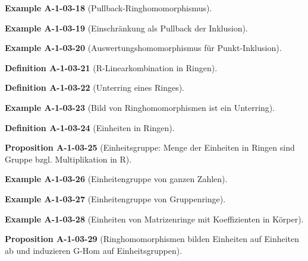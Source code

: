 \documentclass[10pt, letterpaper]{article}
\newcommand{\CustomHeading}[3]{%
  \par\medskip\noindent%
  \textbf{#1 #2} \textnormal{(#3)}.\enskip%
}
\newenvironment{DEF}[2]{\CustomHeading{Definition}{#1}{#2}}{}
\newenvironment{PROP}[2]{\CustomHeading{Proposition}{#1}{#2}}{}
\newenvironment{EXA}[2]{\CustomHeading{Example}{#1}{#2}}{}
\begin{document}
\begin{EXA}{A-1-03-18}{Pullback-Ringhomomorphismus}
\end{EXA}

\begin{EXA}{A-1-03-19}{Einschränkung als Pullback der Inklusion}
\end{EXA}

\begin{EXA}{A-1-03-20}{Auswertungshomomorphismus für Punkt-Inklusion}
\end{EXA}

\begin{DEF}{A-1-03-21}{R-Linearkombination in Ringen}
\end{DEF}

\begin{DEF}{A-1-03-22}{Unterring eines Ringes}
\end{DEF}

\begin{EXA}{A-1-03-23}{Bild von Ringhomomorphismen ist ein Unterring}
\end{EXA}

\begin{DEF}{A-1-03-24}{Einheiten in Ringen}
\end{DEF}

\begin{PROP}{A-1-03-25}{Einheitsgruppe: Menge der Einheiten in Ringen sind Gruppe bzgl. Multiplikation in R}
\end{PROP}

\begin{EXA}{A-1-03-26}{Einheitengruppe von ganzen Zahlen}
\end{EXA}

\begin{EXA}{A-1-03-27}{Einheitengruppe von Gruppenringe}
\end{EXA}

\begin{EXA}{A-1-03-28}{Einheiten von Matrizenringe mit Koeffizienten in Körper}
\end{EXA}

\begin{PROP}{A-1-03-29}{Ringhomomorphismen bilden Einheiten auf Einheiten ab und induzieren G-Hom auf Einheitsgruppen}
\end{PROP}
\end{document}
